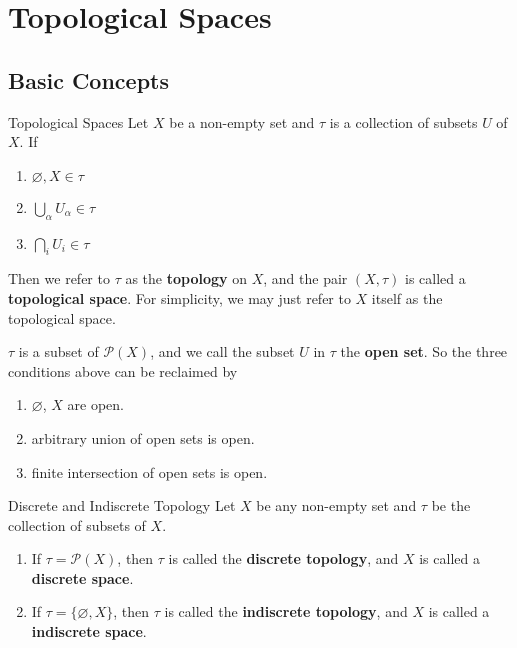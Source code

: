 \section{Topological Spaces}

\subsection{Basic Concepts}\label{sub:Basic Concepts} %

\begin{definition}{Topological Spaces}{}
    Let $X$ be a non-empty set and $\tau$ is a collection of subsets
    $U$ of $X$. If

    \begin{enumerate}

        \item $\varnothing, X \in \tau$
        \item $\bigcup_{\alpha} U_{\alpha} \in \tau$
        \item $\bigcap_{i} U_{i} \in \tau$

    \end{enumerate}
    Then we refer to $\tau$ as the \textbf{topology} on $X$, and the pair
    $(X,\tau)$ is called a \textbf{topological space}. For
    simplicity, we may just refer to $X$ itself as the
    topological space.
\end{definition}

\begin{remarks}
    $\tau$ is a subset of $\mathcal{P}(X)$, and we call the subset
    $U$ in $\tau$ the \textbf{open set}. So the three conditions
    above can be reclaimed by
    \begin{enumerate}
        \item $\varnothing$, $X$ are open.
        \item arbitrary union of open sets is open.
        \item finite intersection of open sets is open.
    \end{enumerate}
\end{remarks}

\begin{definition}{Discrete and Indiscrete Topology}{}
    Let $X$ be any non-empty set and $\tau$ be the collection of
    subsets of $X$.
    \begin{enumerate}

        \item If $\tau = \mathcal{P}(X)$, then $\tau$ is called the
            \textbf{discrete topology}, and $X$ is called a
            \textbf{discrete space}.
        \item If $\tau = \{\varnothing, X\}$, then $\tau$ is called the
            \textbf{indiscrete topology}, and $X$ is called a
            \textbf{indiscrete space}.

    \end{enumerate}
\end{definition}

